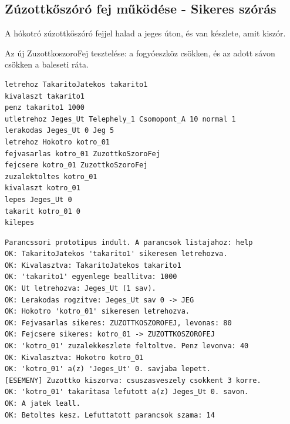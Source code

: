 \subsection{Zúzottkőszóró fej működése - Sikeres szórás}
\begin{test-case-description}
    A hókotró zúzottkőszóró fejjel halad a jeges úton, és van készlete, amit kiszór.
\end{test-case-description}
\begin{test-case-function}
    Az új ZuzottkoszoroFej tesztelése: a fogyóeszköz csökken, és az adott sávon csökken a baleseti ráta.
\end{test-case-function}
\begin{test-case-input}
\begin{verbatim}
letrehoz TakaritoJatekos takarito1
kivalaszt takarito1
penz takarito1 1000
utletrehoz Jeges_Ut Telephely_1 Csomopont_A 10 normal 1
lerakodas Jeges_Ut 0 Jeg 5
letrehoz Hokotro kotro_01
fejvasarlas kotro_01 ZuzottkoSzoroFej
fejcsere kotro_01 ZuzottkoSzoroFej
zuzalektoltes kotro_01
kivalaszt kotro_01
lepes Jeges_Ut 0
takarit kotro_01 0
kilepes
\end{verbatim}
\end{test-case-input}
\begin{test-case-output}
\begin{verbatim}
Parancssori prototipus indult. A parancsok listajahoz: help
OK: TakaritoJatekos 'takarito1' sikeresen letrehozva.
OK: Kivalasztva: TakaritoJatekos takarito1
OK: 'takarito1' egyenlege beallitva: 1000
OK: Ut letrehozva: Jeges_Ut (1 sav).
OK: Lerakodas rogzitve: Jeges_Ut sav 0 -> JEG
OK: Hokotro 'kotro_01' sikeresen letrehozva.
OK: Fejvasarlas sikeres: ZUZOTTKOSZOROFEJ, levonas: 80
OK: Fejcsere sikeres: kotro_01 -> ZUZOTTKOSZOROFEJ
OK: 'kotro_01' zuzalekkeszlete feltoltve. Penz levonva: 40
OK: Kivalasztva: Hokotro kotro_01
OK: 'kotro_01' a(z) 'Jeges_Ut' 0. savjaba lepett.
[ESEMENY] Zuzottko kiszorva: csuszasveszely csokkent 3 korre.
OK: 'kotro_01' takaritasa lefutott a(z) Jeges_Ut 0. savon.
OK: A jatek leall.
OK: Betoltes kesz. Lefuttatott parancsok szama: 14
\end{verbatim}
\end{test-case-output}

